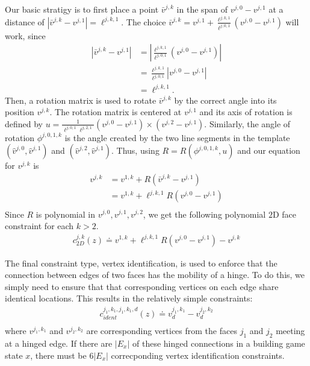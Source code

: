 Our basic stratigy is to first place a point $\bar{v}^{j,k}$ in the span of $v^{j,0} - v^{j,1}$ at a distance of $|\bar{v}^{j,k} - v^{j,1}| = \ell^{j,k,1}$. The choice $\bar{v}^{j,k} = v^{j,1} + \frac{\ell^{j,k,1}}{\ell^{j,0,1}}(v^{j,0} - v^{j,1})$ will work, since 
\begin{align}
  |\bar{v}^{j,k} - v^{j,1}| &= |\frac{\ell^{j,k,1}}{\ell^{j,0,1}}(v^{j,0} - v^{j,1})| \\
  &= \frac{\ell^{j,k,1}}{\ell^{j,0,1}}|v^{j,0} - v^{j,1}| \\
  &= \ell^{j,k,1}.
\end{align}
Then, a rotation matrix is used to rotate $\bar{v}^{j,k}$ by the correct angle into its position $v^{j,k}$.
The rotation matrix is centered at $v^{j,1}$ and its axis of rotation is defined by $u = \frac{1}{\ell^{j,0,1}\ell^{j,2,1}}(v^{j,0} - v^{j,1})\times(v^{j,2} - v^{j,1})$.  Similarly, the angle of rotation $\phi^{j,0,1,k}$ is the angle created by the two line segments in the template $(\hat{v}^{j,0},\hat{v}^{j,1})$ and  $(\hat{v}^{j,2},\hat{v}^{j,1})$. Thus, using $R = R(\phi^{j,0,1,k}, u)$ and our equation for $v^{j,k}$ is 
\begin{align}
v^{j,k} &= v^{1,k} + R(\bar{v}^{j,k} - v^{j,1})\\
&= v^{1,k} + \ell^{j,k,1}R(v^{j,0} - v^{j,1})\\
\end{align}
Since $R$ is polynomial in $v^{j,0}, v^{j,1}, v^{j,2}$, we get the following polynomial $2$D face constraint for each $k > 2$.
\begin{align}
c_{2D}^{j,k}(z) \doteq v^{1,k} + \ell^{j,k,1}R(v^{j,0} - v^{j,1}) - v^{j,k}
\end{align} 

The final constraint type, vertex identification, is used to enforce that the connection between edges of two faces has the mobility of a hinge. To do this, we simply need to ensure that that corresponding vertices on each edge share identical locations. This results in the relatively simple constraints:
\begin{align}
c_{ident}^{j_1,k_1,j_1,k_1,d}(z) \doteq v^{j_1,k_1}_d - v^{j_2,k_2}_d \\
\end{align}
where $v^{j_1,k_1}$ and $v^{j_2,k_2}$ are corresponding vertices from the faces $j_1$ and $j_2$ meeting at a hinged edge. If there are $|E_x|$ of these hinged connections in a building game state $x$, there must be $6|E_x|$ correcponding vertex identification constraints.

